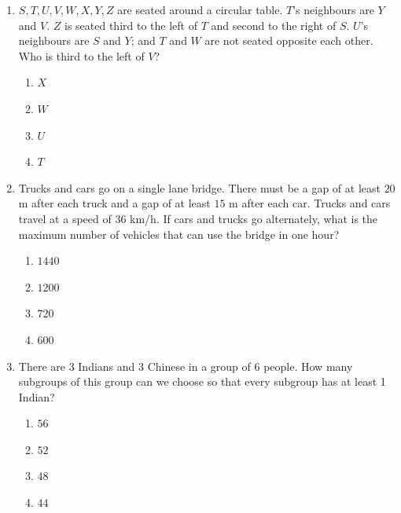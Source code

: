 \documentclass[journal,12pt,onecolumn]{IEEEtran}
\theoremstyle{remark}
\begin{document}
\begin{enumerate}
\item $S, T, U, V, W, X, Y, Z$ are seated around a circular table. $T$'s neighbours are $Y$ and $V$. $Z$ is seated third to the left of $T$ and second to the right of $S$. $U$'s neighbours are $S$ and $Y$; and $T$ and $W$ are not seated opposite each other. Who is third to the left of $V$?
\begin{multicols}{4}
\begin{enumerate}
\item $X$
\item $W$
\item $U$
\item $T$
\end{enumerate}
\end{multicols}
\hfill {}

\item Trucks  and cars  go on a single lane bridge. There must be a gap of at least $20$ m after each truck and a gap of at least $15$ m after each car. Trucks and cars travel at a speed of $36$ km/h. If cars and trucks go alternately, what is the maximum number of vehicles that can use the bridge in one hour?
\begin{multicols}{4}
\begin{enumerate}
\item $1440$
\item $1200$
\item $720$
\item $600$

\end{enumerate}
\end{multicols}
\hfill {}

\item There are 3 Indians and 3 Chinese in a group of 6 people. How many subgroups of this group can we choose so that every subgroup has at least 1 Indian?
\begin{multicols}{4}
    \begin{enumerate}
        \item $56$
        \item $52$
        \item $48$
        \item $44$
    \end{enumerate}
\end{multicols}
\hfill {}


\end{enumerate}
\end{document}
